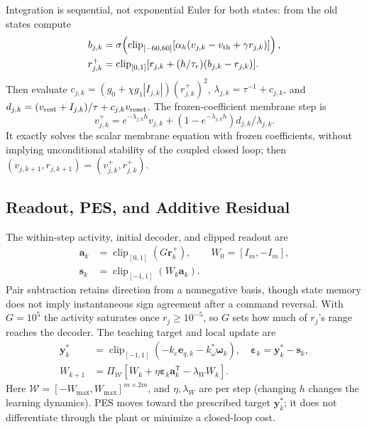 \documentclass[letterpaper, 10 pt, conference]{ieeeconf}
\newcommand{\T}{^{\mathsf T}}
\newcommand{\clip}{\operatorname{clip}}
\begin{document}
Integration is sequential, not exponential Euler for both states: from
the old states compute
\begin{align}
 b_{j,k}&=\sigma\!\left(\clip_{[-60,60]}
       [\alpha_h(v_{j,k}-v_{\rm th}+\gamma r_{j,k})]\right),\\
 r_{j,k}^{+}&=\clip_{[0,1]}
       [r_{j,k}+(h/\tau_r)(b_{j,k}-r_{j,k})].
 \label{eq:gate_step}
\end{align}
Then evaluate $c_{j,k}=(g_0+\chi g_1|I_{j,k}|)(r_{j,k}^{+})^2$,
$\lambda_{j,k}=\tau^{-1}+c_{j,k}$, and
$d_{j,k}=(v_{\rm rest}+I_{j,k})/\tau+c_{j,k}v_{\rm reset}$. The
frozen-coefficient membrane step is
\begin{equation}
 v_{j,k}^{+}=e^{-\lambda_{j,k}h}v_{j,k}
       +(1-e^{-\lambda_{j,k}h})d_{j,k}/\lambda_{j,k}.
 \label{eq:mem_step}
\end{equation}
It exactly solves the scalar membrane equation with frozen coefficients,
without implying unconditional stability of the coupled closed loop; then
$(v_{j,k+1},r_{j,k+1})=(v_{j,k}^{+},r_{j,k}^{+})$.

\subsection{Readout, PES, and Additive Residual}
The within-step activity, initial decoder, and clipped readout are
\begin{equation}
 \begin{aligned}
 \bm a_k&=\clip_{[0,1]}(G\bm r_k^+),\qquad W_0=[I_m,-I_m],\\
 \bm s_k&=\clip_{[-1,1]}(W_k\bm a_k).
 \end{aligned}
 \label{eq:readout}
\end{equation}
Pair subtraction retains direction from a nonnegative basis, though state
memory does not imply instantaneous sign agreement after a command
reversal. With $G=10^5$ the activity saturates once $r_j\ge10^{-5}$, so
$G$ sets how much of $r_j$'s range reaches the decoder. The teaching
target and local update are
\begin{align}
 \bm y_k^*&=\clip_{[-1,1]}(-k_e\bm e_{q,k}-k_\omega^*\bm\omega_k),\quad
 \bm\varepsilon_k=\bm y_k^*-\bm s_k,\\
 W_{k+1}&=\Pi_{\mathcal W}
       [W_k+\eta\bm\varepsilon_k\bm a_k\T-\lambda_W W_k].
 \label{eq:pes}
\end{align}
Here $\mathcal W=[-W_{\max},W_{\max}]^{m\times2m}$, and $\eta,\lambda_W$
are per step (changing $h$ changes the learning dynamics). PES moves
toward the prescribed target $\bm y_k^*$; it does not differentiate
through the plant or minimize a closed-loop cost.
\end{document}
